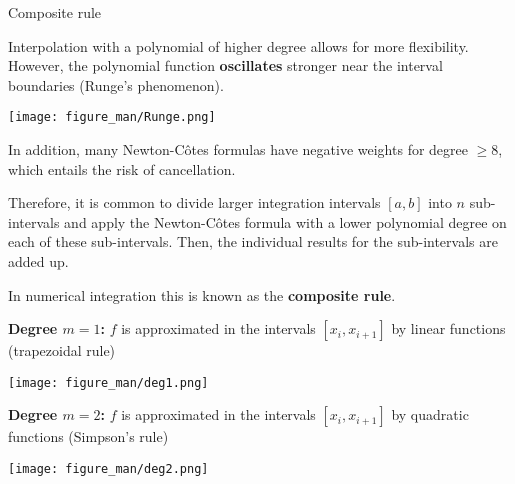 \documentclass[11pt,compress,t,notes=noshow, xcolor=table]{beamer}
\begin{document}
\begin{vbframe}{Composite rule}

Interpolation with a polynomial of higher degree allows for more flexibility. However, the polynomial function \textbf{oscillates} stronger near the interval boundaries (Runge's phenomenon).

\begin{center}
\texttt{[image: figure\_man/Runge.png]}
\end{center}


\framebreak

In addition, many Newton-C\^{o}tes formulas have negative weights for degree $\geq 8$, which entails the risk of cancellation.

\lz

Therefore, it is common to divide larger integration intervals $[a, b]$ into $n$ sub-intervals and apply the Newton-C\^{o}tes formula with a lower polynomial degree on each of these sub-intervals. Then, the individual results for the sub-intervals are added up.

\lz

In numerical integration this is known as the \textbf{composite rule}.

\framebreak

\textbf{Degree $m = 1$:} $f$ is approximated in the intervals $[x_i, x_{i + 1}]$ by linear functions (trapezoidal rule)

\begin{center}
\texttt{[image: figure\_man/deg1.png]}
\end{center}




\framebreak

\textbf{Degree $m = 2$:} $f$ is approximated in the intervals $[x_i, x_{i + 1}]$ by quadratic functions (Simpson's rule)


\begin{center}
\texttt{[image: figure\_man/deg2.png]}
\end{center}



\end{vbframe}
\end{document}
